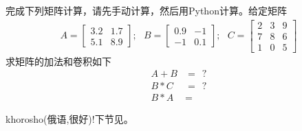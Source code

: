 \documentclass[12pt]{article}
\numberwithin{equation}{section}
\numberwithin{figure}{section}
\newenvironment{question}[2][Question]{\begin{trivlist}
\item[\hskip \labelsep {\bfseries #1}\hskip \labelsep {\bfseries #2.}]}{\end{trivlist}}
\begin{document}
\begin{question}{计算题 C3-Q4}
	完成下列矩阵计算，请先手动计算，然后用Python计算。给定矩阵
	\begin{align*}
		A = \begin{bmatrix}
			3.2 & 1.7 \\
			5.1 & 8.9 
		\end{bmatrix}; \ \ \ B = \begin{bmatrix}
			0.9 & -1 \\
			 -1 & 0.1 
		\end{bmatrix}; \ \ \ C = \begin{bmatrix}
			2 & 3 & 9 \\
			7 & 8 & 6 \\
			1 & 0 & 5 
		\end{bmatrix}
	\end{align*}
	求矩阵的加法和卷积如下
	\begin{align*}
		A + B & = \ \ ? \\
		B * C &= \ \ ? \\
		B * A & = 
	\end{align*}
\end{question}


\noindent
khorosho(俄语,很好)!下节见。
\end{document}
